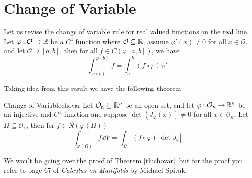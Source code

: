 \documentclass[../Analysis-3.tex]{subfiles}
\begin{document}
\section{Change of Variable}

Let us revise the change of variable rule for real valued functions on the real line. Let $\varphi : \mathcal{O} \to \mathbb{R}$ be a $C^1$ function where $\mathcal{O} \subseteq \mathbb{R}$, assume $\varphi'(x) \neq 0$ for all $x \in \mathcal{O}$, and let $\mathcal{O} \supseteq [a,b]$, then for all $f \in C(\varphi[a,b])$, we have
\[
  \int_{\varphi(a)}^{\varphi(b)} f = \int_a^b (f \circ \varphi) \varphi'
\]

Taking idea from this result we have the following theorem

\begin{Thm}{Change of Variable}{chovar}
  Let $\mathcal{O}_n \subseteq \mathbb{R}^n$ be an open set, and let $\varphi : \mathcal{O}_n \to \mathbb{R}^n$ be an injective and $C^1$ function and suppose $\det(J_{\varphi}(x)) \neq 0$ for all $x \in \mathcal{O}_n$. Let $\Omega \subseteq \mathcal{O}_n$, then for $f \in \mathscr{R}(\varphi(\Omega))$
  \[
    \int_{\varphi(\Omega)} f \, \dd V = \int_{\Omega} (f \circ \varphi) |\det J_{\varphi}|
  \]
\end{Thm}
We won't be going over the proof of Theorem \ref{th:chovar}, but for the proof you refer to page 67 of \textit{Calculus on Manifolds} by Michael Spivak.
\end{document}
